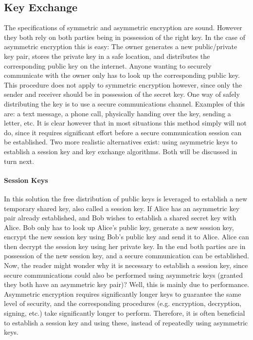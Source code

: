 \documentclass[master=cws,masteroption=vs,english]{kulemt}
\begin{document}
\subsection{Key Exchange} The specifications of symmetric and asymmetric encryption are sound. However they both rely on both parties being in possession of the right key. In the case of asymmetric encryption this is easy: The owner generates a new public/private key pair, stores the private key in a safe location, and distributes the corresponding public key on the internet. Anyone wanting to securely communicate with the owner only has to look up the corresponding public key. This procedure does not apply to symmetric encryption however, since only the sender and receiver should be in possession of the secret key. One way of safely distributing the key is to use a secure communications channel. Examples of this are: a text message, a phone call, physically handing over the key, sending a letter, etc. It is clear however that in most situations this method simply will not do, since it requires significant effort before a secure communication session can be established. Two more realistic alternatives exist: using asymmetric keys to establish a session key and key exchange algorithms. Both will be discussed in turn next.

\paragraph{Session Keys} In this solution the free distribution of public keys is leveraged to establish a new temporary shared key, also called a session key. If Alice has an asymmetric key pair already established, and Bob wishes to establish a shared secret key with Alice. Bob only has to look up Alice's public key, generate a new session key, encrypt the new session key using Bob's public key and send it to Alice. Alice can then decrypt the session key using her private key. In the end both parties are in possession of the new session key, and a secure communication can be established. Now, the reader might wonder why it is necessary to establish a session key, since secure communications could also be performed using asymmetric keys (granted they both have an asymmetric key pair)? Well, this is mainly due to performance. Asymmetric encryption requires significantly longer keys to guarantee the same level of security, and the corresponding procedures (e.g. encryption, decryption, signing, etc.) take significantly longer to perform. Therefore, it is often beneficial to establish a session key and using these, instead of repeatedly using asymmetric keys.
\end{document}

